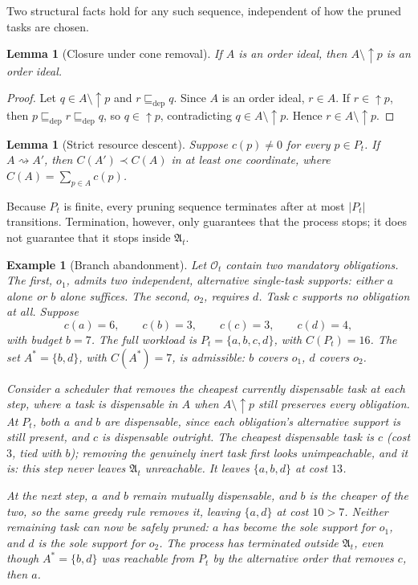 \documentclass[11pt]{report}
\newtheorem{lemma}[definition]{Lemma}
\newtheorem{example}[definition]{Example}
\begin{document}
Two structural facts hold for any such sequence, independent of how the pruned tasks are chosen.

\begin{lemma}[Closure under cone removal]
If $A$ is an order ideal, then $A \setminus \uparrow p$ is an order ideal.
\end{lemma}
\begin{proof}
Let $q \in A \setminus \uparrow p$ and $r \sqsubseteq_{\mathrm{dep}} q$. Since $A$ is an order ideal, $r \in A$. If $r \in \uparrow p$, then $p \sqsubseteq_{\mathrm{dep}} r \sqsubseteq_{\mathrm{dep}} q$, so $q \in \uparrow p$, contradicting $q \in A \setminus \uparrow p$. Hence $r \in A \setminus \uparrow p$.
\end{proof}

\begin{lemma}[Strict resource descent]
Suppose $c(p) \ne 0$ for every $p \in P_t$. If $A \rightsquigarrow A'$, then $C(A') \prec C(A)$ in at least one coordinate, where $C(A) = \sum_{p \in A} c(p)$.
\end{lemma}

Because $P_t$ is finite, every pruning sequence terminates after at most $|P_t|$ transitions. Termination, however, only guarantees that the process stops; it does not guarantee that it stops inside $\mathfrak A_t$.

\begin{example}[Branch abandonment]
\label{ex:branch}
Let $\mathcal O_t$ contain two mandatory obligations. The first, $o_1$, admits two independent, alternative single-task supports: either $a$ alone or $b$ alone suffices. The second, $o_2$, requires $d$. Task $c$ supports no obligation at all. Suppose
\[
c(a) = 6, \qquad c(b) = 3, \qquad c(c) = 3, \qquad c(d) = 4,
\]
with budget $b = 7$. The full workload is $P_t = \{a, b, c, d\}$, with $C(P_t) = 16$. The set $A^\ast = \{b, d\}$, with $C(A^\ast) = 7$, is admissible: $b$ covers $o_1$, $d$ covers $o_2$.

Consider a scheduler that removes the cheapest currently dispensable task at each step, where a task is dispensable in $A$ when $A \setminus \uparrow p$ still preserves every obligation. At $P_t$, both $a$ and $b$ are dispensable, since each obligation's alternative support is still present, and $c$ is dispensable outright. The cheapest dispensable task is $c$ (cost $3$, tied with $b$); removing the genuinely inert task first looks unimpeachable, and it is: this step never leaves $\mathfrak A_t$ unreachable. It leaves $\{a, b, d\}$ at cost $13$.

At the next step, $a$ and $b$ remain mutually dispensable, and $b$ is the cheaper of the two, so the same greedy rule removes it, leaving $\{a, d\}$ at cost $10 > 7$. Neither remaining task can now be safely pruned: $a$ has become the sole support for $o_1$, and $d$ is the sole support for $o_2$. The process has terminated outside $\mathfrak A_t$, even though $A^\ast = \{b, d\}$ was reachable from $P_t$ by the alternative order that removes $c$, then $a$.
\end{example}
\end{document}
